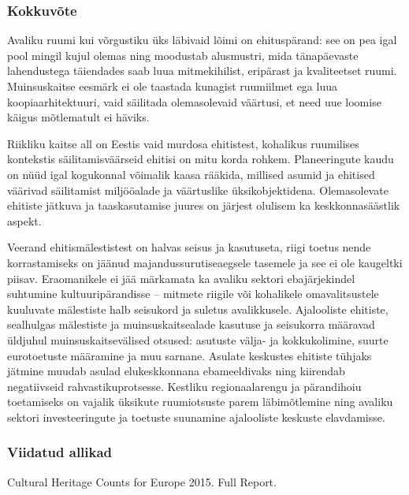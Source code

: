 \documentclass[estonian,]{article}
\begin{document}
\hypertarget{kokkuvuxf5te-4}{%
\subsubsection*{Kokkuvõte}\label{kokkuvuxf5te-4}}

Avaliku ruumi kui võrgustiku üks läbivaid lõimi on ehituspärand: see on pea igal pool mingil kujul olemas ning moodustab alusmustri, mida tänapäevaste lahendustega täiendades saab luua mitmekihilist, eripärast ja kvaliteetset ruumi. Muinsuskaitse eesmärk ei ole taastada kunagist ruumiilmet ega luua koopiaarhitektuuri, vaid säilitada olemasolevaid väärtusi, et need uue loomise käigus mõtlematult ei häviks.

Riikliku kaitse all on Eestis vaid murdosa ehitistest, kohalikus ruumilises kontekstis säilitamisväärseid ehitisi on mitu korda rohkem. Planeeringute kaudu on nüüd igal kogukonnal võimalik kaasa rääkida, millised asumid ja ehitised väärivad säilitamist miljööalade ja väärtuslike üksikobjektidena. Olemasolevate ehitiste jätkuva ja taaskasutamise juures on järjest olulisem ka keskkonnasäästlik aspekt.

Veerand ehitismälestistest on halvas seisus ja kasutuseta, riigi toetus nende korrastamiseks on jäänud majandussurutiseaegsele tasemele ja see ei ole kaugeltki piisav. Eraomanikele ei jää märkamata ka avaliku sektori ebajärjekindel suhtumine kultuuripärandisse -- mitmete riigile või kohalikele omavalitsustele kuuluvate mälestiste halb seisukord ja suletus avalikkusele.
Ajalooliste ehitiste, sealhulgas mälestiste ja muinsuskaitsealade kasutuse ja seisukorra määravad üldjuhul muinsuskaitsevälised otsused: asutuste välja- ja kokkukolimine, suurte eurotoetuste määramine ja muu sarnane. Asulate keskustes ehitiste tühjaks jätmine muudab asulad elukeskkonnana ebameeldivaks ning kiirendab negatiivseid rahvastikuprotsesse. Kestliku regionaalarengu ja pärandihoiu toetamiseks on vajalik üksikute ruumiotsuste parem läbimõtlemine ning avaliku sektori investeeringute ja toetuste suunamine ajalooliste keskuste elavdamisse.

\hypertarget{viidatud-allikad-8}{%
\subsubsection*{Viidatud allikad}\label{viidatud-allikad-8}}

Cultural Heritage Counts for Europe 2015. Full Report.
\end{document}
